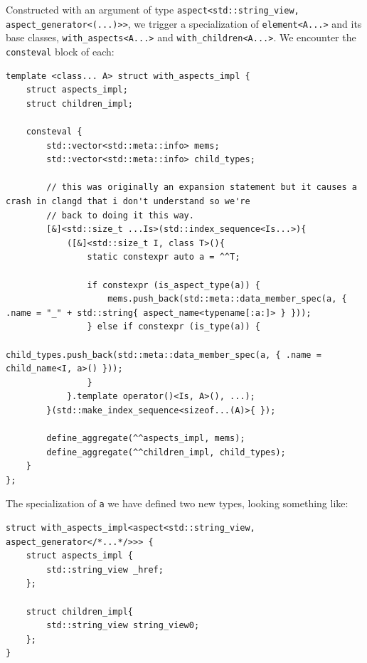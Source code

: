 \documentclass[10pt]{article}
\begin{document}
Constructed with an argument of type \texttt{aspect<std::string_view, aspect_generator<(...)>>}, we trigger a specialization of \texttt{element<A...>} and its base classes, \texttt{with_aspects<A...>} and \texttt{with_children<A...>}. We encounter the \texttt{consteval} block of each:

\begin{verbatim}
template <class... A> struct with_aspects_impl {
    struct aspects_impl;
    struct children_impl;

    consteval {
        std::vector<std::meta::info> mems;
        std::vector<std::meta::info> child_types;

        // this was originally an expansion statement but it causes a crash in clangd that i don't understand so we're
        // back to doing it this way.
        [&]<std::size_t ...Is>(std::index_sequence<Is...>){
            ([&]<std::size_t I, class T>(){
                static constexpr auto a = ^^T;

                if constexpr (is_aspect_type(a)) {
                    mems.push_back(std::meta::data_member_spec(a, { .name = "_" + std::string{ aspect_name<typename[:a:]> } }));
                } else if constexpr (is_type(a)) {
                    child_types.push_back(std::meta::data_member_spec(a, { .name = child_name<I, a>() }));
                }
            }.template operator()<Is, A>(), ...);
        }(std::make_index_sequence<sizeof...(A)>{ });

        define_aggregate(^^aspects_impl, mems);
        define_aggregate(^^children_impl, child_types);
    }
};
\end{verbatim}


The specialization of \texttt{a} we have defined two new types, looking something like:

\begin{verbatim}
struct with_aspects_impl<aspect<std::string_view, aspect_generator</*...*/>>> {
    struct aspects_impl {
        std::string_view _href;
    };

    struct children_impl{
        std::string_view string_view0;
    };
}
\end{verbatim}
\end{document}
